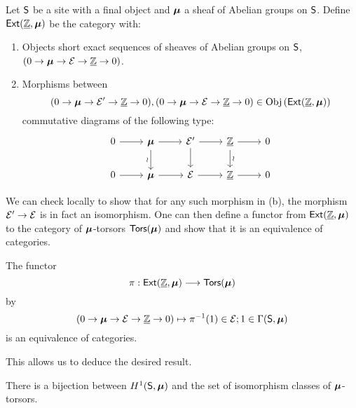 \begin{definition}[$\Extsf(\underline{\ZZ},\Bmu)$]\label{def: ext category on integer sheaf}
    Let $\mathsf{S}$ be a site with a final object and $\bm{\mu}$ a sheaf of Abelian groups on $\mathsf{S}$. Define $\Extsf(\underline{\ZZ},\Bmu)$ be the category with: 
    \begin{enumerate}[label=(\alph*)]
        \item Objects short exact sequences of sheaves of Abelian groups on $\mathsf{S}$, $(0\to\bm{\mu}\to\mathcal{E}\to\underline{\mathbb{Z}}\to0)$. 
        \item Morphisms between 
        $$(0\to\bm{\mu}\to\mathcal{E}'\to\underline{\mathbb{Z}}\to0),(0\to\bm{\mu}\to\mathcal{E}\to\underline{\mathbb{Z}}\to0)\in\mathrm{Obj}\left(\mathsf{Ext}(\underline{\mathbb{Z}},\bm{\mu})\right)$$
        commutative diagrams of the following type:
        $$%
        \begin{tikzcd}
            0 & \Bmu & {\Ecal'} & {\underline{\ZZ}} & 0 \\
            0 & \Bmu & \Ecal & {\underline{\ZZ}} & 0
            \arrow[from=1-1, to=1-2]
            \arrow[from=1-2, to=1-3]
            \arrow[from=1-3, to=1-4]
            \arrow[from=1-4, to=1-5]
            \arrow[from=2-1, to=2-2]
            \arrow[from=2-2, to=2-3]
            \arrow[from=2-3, to=2-4]
            \arrow[from=2-4, to=2-5]
            \arrow["\wr", from=1-4, to=2-4]
            \arrow[from=1-3, to=2-3]
            \arrow["\wr"', from=1-2, to=2-2]
        \end{tikzcd}$$
    \end{enumerate}
\end{definition}
We can check locally to show that for any such morphism in  (b), the morphism $\mathcal{E}'\to\mathcal{E}$ is in fact an isomorphism. One can then define a functor from $\Extsf(\underline{\ZZ},\Bmu)$ to the category of $\bm{\mu}$-torsors $\mathsf{Tors}(\bm{\mu})$ and show that it is an equivalence of categories. 
\begin{proposition}\label{prop: integer ext category is equivalent to torsor category}
    The functor 
    $$\pi:\mathsf{Ext}(\underline{\mathbb{Z}},\bm{\mu})\longrightarrow\mathsf{Tors}(\bm{\mu})$$
    by
    $$(0\to\bm{\mu}\to\mathcal{E}\to\underline{\mathbb{Z}}\to0)\mapsto \pi^{-1}(1)\in\mathcal{E}; 1\in\Gamma(\mathsf{S},\bm{\mu})$$
    is an equivalence of categories. 
\end{proposition}
This allows us to deduce the desired result. 
\begin{corollary}\label{prop: bijection of first cohomology and iso classes of torsors}
    There is a bijection between $H^{1}(\mathsf{S},\bm{\mu})$ and the set of isomorphism classes of $\bm{\mu}$-torsors. 
\end{corollary}
